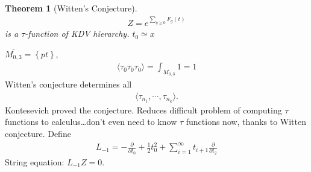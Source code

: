 \documentclass[12pt,reqno]{amsart}
\numberwithin{equation}{section}  %
\newcommand{\p}{\partial}
\newtheorem{theorem}{Theorem}[section]
\begin{document}
%
%
%
%
%                
%
%
%
%
\begin{theorem}[Witten's Conjecture]
\begin{gather*}
  Z = e^{\sum_{g \ge 0} F_{g}(t)}
\end{gather*}
is a $\tau$-function of KDV hierarchy. $t_{0} \simeq x$
\label{thm:witt}
\end{theorem}
%
%
$\bar{M_{0,3}} = \left\{ pt \right\}$, 
\begin{gather*}
  \langle \tau_{0} \tau_{0} \tau_{0} \rangle  = \int_{\bar{M_{0,3}}} 1 =1
\end{gather*}
Witten's conjecture determines all
\begin{gather*}
  \langle \tau_{n_{1}}, \cdots, \tau_{n_{k}} \rangle. 
\end{gather*}
Kontesevich proved the conjecture. Reduces difficult problem of computing $\tau$
functions to calculus\ldots don't even need to know $\tau$ functions now, thanks
to Witten conjecture. Define
\begin{gather*}
  L_{-1} = -\frac{\p}{\p t_{0}} + \frac{1}{2} t_{0}^{2} + \sum_{i=1}^{\infty}
  t_{i+1} \frac{\p}{\p t_{2}}
\end{gather*}
String equation: $L_{-1} Z = 0$.
\end{document}
